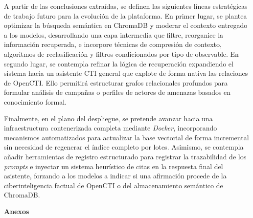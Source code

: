 \documentclass[12pt]{report}
\begin{document}
A partir de las conclusiones extraídas, se definen las siguientes líneas estratégicas de trabajo futuro para la evolución de la plataforma. En primer lugar, se plantea optimizar la búsqueda semántica en ChromaDB y moderar el contexto entregado a los modelos, desarrollando una capa intermedia que filtre, reorganice la información recuperada, e incorpore técnicas de compresión de contexto, algoritmos de reclasificación y filtros condicionados por tipo de observable. En segundo lugar, se contempla refinar la lógica de recuperación expandiendo el sistema hacia un asistente CTI general que explote de forma nativa las relaciones de OpenCTI. Ello permitirá estructurar grafos relacionales profundos para formular análisis de campañas o perfiles de actores de amenazas basados en conocimiento formal.

Finalmente, en el plano del despliegue, se pretende avanzar hacia una infraestructura contenerizada completa mediante \textit{Docker}, incorporando mecanismos automatizados para actualizar la base vectorial de forma incremental sin necesidad de regenerar el índice completo por lotes. Asimismo, se contempla añadir herramientas de registro estructurado para registrar la trazabilidad de los \textit{prompts} e inyectar un sistema heurístico de citas en la respuesta final del asistente, forzando a los modelos a indicar si una afirmación procede de la ciberinteligencia factual de OpenCTI o del almacenamiento semántico de ChromaDB.

\newpage
\printbibliography[title={Bibliografía}]
\newpage
\renewcommand{\appendixname}{Anexo}
\huge
\vspace*{\fill}
\begin{center}
	\textbf{Anexos}
\end{center}
\vspace*{\fill}
\normalsize
\appendix
\end{document}
